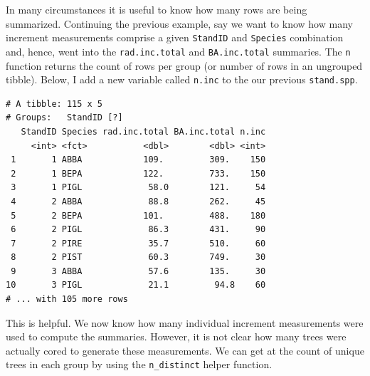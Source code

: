 \documentclass[]{krantz}
\makeatletter
\newenvironment{Shaded}{\begin{snugshade}}{\end{snugshade}}
\newcommand{\KeywordTok}[1]{\textcolor[rgb]{0.27,0.27,0.27}{\textbf{#1}}}
\newcommand{\DataTypeTok}[1]{\textcolor[rgb]{0.27,0.27,0.27}{#1}}
\newcommand{\StringTok}[1]{\textcolor[rgb]{0.5,0.5,0.5}{#1}}
\newcommand{\OperatorTok}[1]{\textcolor[rgb]{0.43,0.43,0.43}{\textbf{#1}}}
\newcommand{\NormalTok}[1]{#1}
\newenvironment{kframe}{%
\medskip{}
\setlength{\fboxsep}{.8em}
 \def\at@end@of@kframe{}%
 \ifinner\ifhmode%
  \def\at@end@of@kframe{\end{minipage}}%
  \begin{minipage}{\columnwidth}%
 \fi\fi%
 \def\FrameCommand##1{\hskip\@totalleftmargin \hskip-\fboxsep
 \colorbox{shadecolor}{##1}\hskip-\fboxsep
     \hskip-\linewidth \hskip-\@totalleftmargin \hskip\columnwidth}%
 \MakeFramed {\advance\hsize-\width
   \@totalleftmargin\z@ \linewidth\hsize
   \@setminipage}}%
 {\par\unskip\endMakeFramed%
 \at@end@of@kframe}
\renewenvironment{Shaded}{\begin{kframe}}{\end{kframe}}
\theoremstyle{definition}
\theoremstyle{definition}
\theoremstyle{definition}
\theoremstyle{remark}
\makeatother
\begin{document}
In many circumstances it is useful to know how many rows are being
summarized. Continuing the previous example, say we want to know how
many increment measurements comprise a given \texttt{StandID} and
\texttt{Species} combination and, hence, went into the
\texttt{rad.inc.total} and \texttt{BA.inc.total} summaries. The
\texttt{n} function returns the count of rows per group (or number of
rows in an ungrouped tibble). Below, I add a new variable called
\texttt{n.inc} to the our previous \texttt{stand.spp}.

\begin{Shaded}
\end{Shaded}

\begin{verbatim}
# A tibble: 115 x 5
# Groups:   StandID [?]
   StandID Species rad.inc.total BA.inc.total n.inc
     <int> <fct>           <dbl>        <dbl> <int>
 1       1 ABBA            109.         309.    150
 2       1 BEPA            122.         733.    150
 3       1 PIGL             58.0        121.     54
 4       2 ABBA             88.8        262.     45
 5       2 BEPA            101.         488.    180
 6       2 PIGL             86.3        431.     90
 7       2 PIRE             35.7        510.     60
 8       2 PIST             60.3        749.     30
 9       3 ABBA             57.6        135.     30
10       3 PIGL             21.1         94.8    60
# ... with 105 more rows
\end{verbatim}

This is helpful. We now know how many individual increment measurements
were used to compute the summaries. However, it is not clear how many
trees were actually cored to generate these measurements. We can get at
the count of unique trees in each group by using the
\texttt{n\_distinct} helper function.
\end{document}
